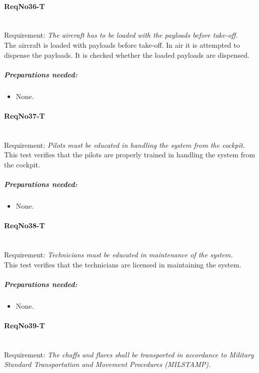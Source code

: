 \paragraph{ReqNo36-T}\mbox{}\\ %
Requirement: \textit{The aircraft has to be loaded with the payloads before take-off.}
\\
The aircraft is loaded with payloads before take-off. In air it is attempted to dispense the payloads. It is checked whether the loaded payloads are dispensed.
\\
	\subparagraph{Preparations needed:}
	\begin{itemize}
	\item None.
	\end{itemize} 

\paragraph{ReqNo37-T}\mbox{}\\ %
Requirement: \textit{Pilots must be educated in handling the system from the cockpit.}
\\
This test verifies that the pilots are properly trained in handling the system from the cockpit.
\\
	\subparagraph{Preparations needed:}
	\begin{itemize}
	\item None.
	\end{itemize} 

\paragraph{ReqNo38-T}\mbox{}\\ %
Requirement: \textit{Technicians must be educated in maintenance of the system.}\\
This test verifies that the technicians are licensed in maintaining the system.
	\subparagraph{Preparations needed:}
	\begin{itemize}
	\item None.
	\end{itemize}


\paragraph{ReqNo39-T}\mbox{}\\ %
Requirement: \textit{The chaffs and flares shall be transported in accordance to Military Standard Transportation and Movement Procedures (MILSTAMP).}\\

